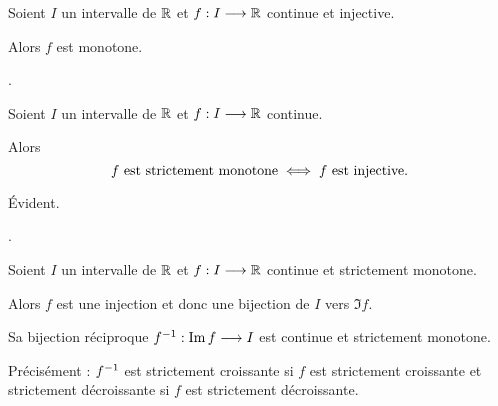 \begin{theo}
Soient \(I\) un intervalle de \(\mathbb{R}\) et \(f:I\longrightarrow\mathbb{R}\) continue et injective.

Alors \(f\) est monotone.
\end{theo}

\begin{dem}
 \Cf {}.
\end{dem}

\begin{cor}
Soient \(I\) un intervalle de \(\mathbb{R}\) et \(f:I\longrightarrow\mathbb{R}\) continue.

Alors \[f\text{ est strictement monotone}\iff f\text{ est injective.}\]
\end{cor}

\begin{dem}
\impdir Évident.

\imprec {}.
\end{dem}

\begin{theo}
Soient \(I\) un intervalle de \(\mathbb{R}\) et \(f:I\longrightarrow\mathbb{R}\) continue et strictement monotone.

Alors \(f\) est une injection et donc une bijection de \(I\) vers \(\Im f\).

Sa bijection réciproque \(f^{-1}:\operatorname{Im} f\longrightarrow I\) est continue et strictement monotone.

Précisément : \(f^{-1}\) est strictement croissante si \(f\) est strictement croissante et strictement décroissante si \(f\) est strictement décroissante.
\end{theo}

